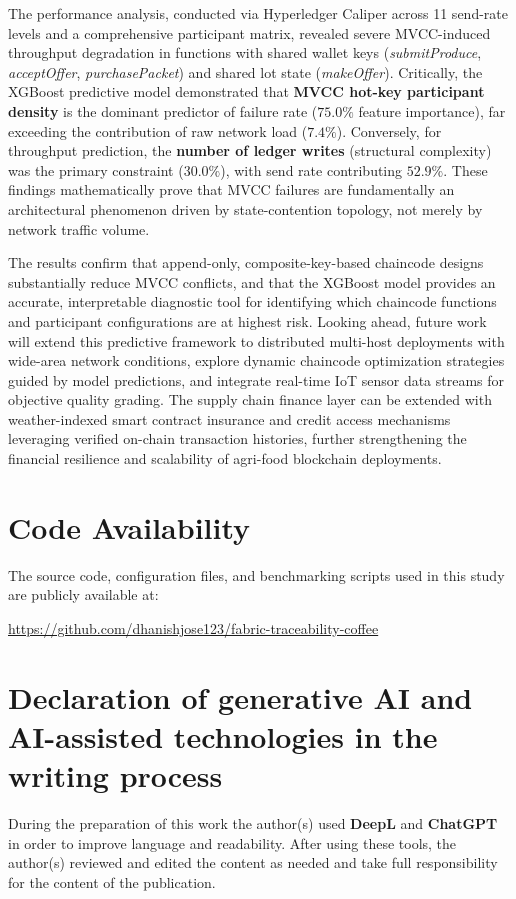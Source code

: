 \documentclass[manuscript,screen]{acmart}
\begin{document}
	The performance analysis, conducted via Hyperledger Caliper across 11 send-rate levels and a comprehensive participant matrix, revealed severe MVCC-induced throughput degradation in functions with shared wallet keys (\textit{submitProduce}, \textit{acceptOffer}, \textit{purchasePacket}) and shared lot state (\textit{makeOffer}). Critically, the XGBoost predictive model demonstrated that \textbf{MVCC hot-key participant density} is the dominant predictor of failure rate ($75.0\%$ feature importance), far exceeding the contribution of raw network load ($7.4\%$). Conversely, for throughput prediction, the \textbf{number of ledger writes} (structural complexity) was the primary constraint ($30.0\%$), with send rate contributing $52.9\%$. These findings mathematically prove that MVCC failures are fundamentally an architectural phenomenon driven by state-contention topology, not merely by network traffic volume.
	
	The results confirm that append-only, composite-key-based chaincode designs substantially reduce MVCC conflicts, and that the XGBoost model provides an accurate, interpretable diagnostic tool for identifying which chaincode functions and participant configurations are at highest risk. Looking ahead, future work will extend this predictive framework to distributed multi-host deployments with wide-area network conditions, explore dynamic chaincode optimization strategies guided by model predictions, and integrate real-time IoT sensor data streams for objective quality grading. The supply chain finance layer can be extended with weather-indexed smart contract insurance and credit access mechanisms leveraging verified on-chain transaction histories, further strengthening the financial resilience and scalability of agri-food blockchain deployments.
	
	\section*{Code Availability}
	
	The source code, configuration files, and benchmarking scripts used in this study are publicly available at:
	
	\url{https://github.com/dhanishjose123/fabric-traceability-coffee}
	
	
	\section*{Declaration of generative AI and AI-assisted technologies in the writing process}
	During the preparation of this work the author(s) used \textbf{DeepL} and \textbf{ChatGPT} in order to improve language and readability. 
	After using these tools, the author(s) reviewed and edited the content as needed and take full responsibility for the content of the publication.
	
\end{document}
